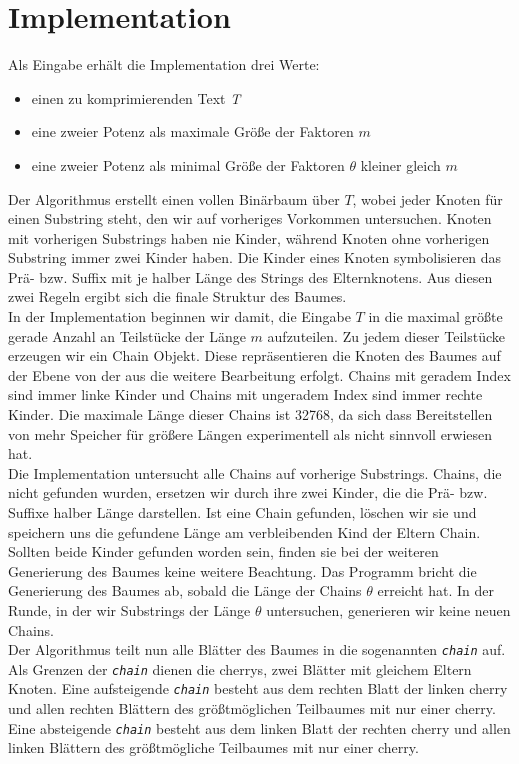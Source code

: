\section{Implementation}
Als Eingabe erhält die Implementation drei Werte:
\begin{itemize}
	\item einen zu komprimierenden Text \textit{T}
	\item eine zweier Potenz als maximale Größe der Faktoren $m$
	\item eine zweier Potenz  als minimal Größe der Faktoren $\theta$ kleiner gleich  $m$ 
\end{itemize} 
Der Algorithmus erstellt einen vollen Binärbaum über $T$, wobei jeder Knoten für einen Substring steht, den wir auf vorheriges Vorkommen untersuchen. Knoten mit vorherigen Substrings haben nie Kinder, während Knoten ohne vorherigen Substring immer zwei Kinder haben. Die Kinder eines Knoten symbolisieren das Prä- bzw. Suffix mit je halber Länge des Strings des Elternknotens. Aus diesen zwei Regeln ergibt sich die finale Struktur des Baumes.\\
%
%
In der Implementation beginnen wir damit, die Eingabe $T$ in die maximal größte gerade Anzahl an Teilstücke der Länge $m$ aufzuteilen. Zu jedem dieser Teilstücke erzeugen wir ein Chain Objekt. Diese repräsentieren die Knoten des Baumes auf der Ebene von der aus die weitere Bearbeitung erfolgt. Chains mit geradem Index sind immer linke Kinder und Chains mit ungeradem Index sind immer rechte Kinder. Die maximale Länge dieser Chains ist 32768, da sich dass Bereitstellen von mehr Speicher für größere Längen experimentell als nicht sinnvoll erwiesen hat.\\
%
%
Die Implementation untersucht alle Chains auf vorherige Substrings. Chains, die nicht gefunden wurden, ersetzen wir durch ihre zwei Kinder, die die Prä- bzw. Suffixe halber Länge darstellen. Ist eine Chain gefunden, löschen wir sie und speichern uns die gefundene Länge am verbleibenden Kind der Eltern Chain. Sollten beide Kinder gefunden worden sein, finden sie bei der weiteren Generierung des Baumes keine weitere Beachtung.
%
%
Das Programm bricht die Generierung des Baumes ab, sobald die Länge der Chains $\theta$ erreicht hat. In der Runde, in der wir Substrings der Länge $\theta$ untersuchen, generieren wir keine neuen Chains.\\
Der Algorithmus teilt nun alle Blätter des Baumes in  die sogenannten \textit{\texttt{chain}}  auf. Als Grenzen der \textit{\texttt{chain}}  dienen die cherrys, zwei Blätter mit gleichem Eltern Knoten. Eine aufsteigende \textit{\texttt{chain}}  besteht aus dem rechten Blatt der linken cherry und allen rechten Blättern des größtmöglichen Teilbaumes mit nur einer cherry. Eine absteigende \textit{\texttt{chain}}  besteht aus dem linken Blatt der rechten cherry und allen linken Blättern des größtmögliche Teilbaumes mit nur einer cherry.\\
